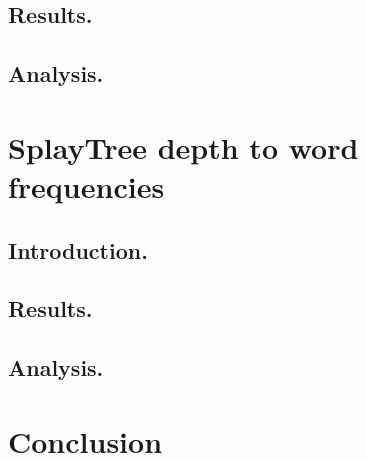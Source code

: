 \documentclass[12pt,a4paper]{article}
\begin{document}
\subsection{Results.} 

\subsection{Analysis.} 

\section{SplayTree depth to word frequencies}
\subsection{Introduction.} 

\subsection{Results.} 

\subsection{Analysis.} 

\section*{Conclusion} 
\end{document}
